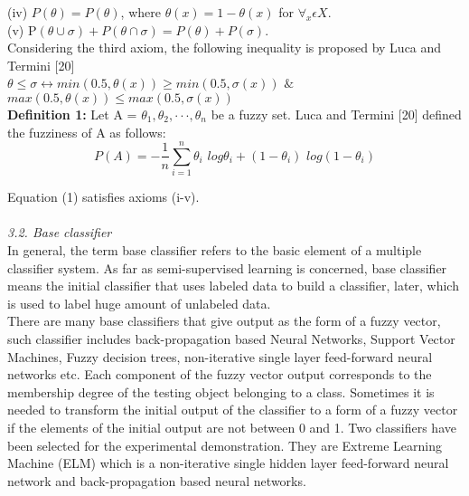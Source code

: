 \documentclass{article}
\begin{document}
		\newpage
		(iv) $P{(\theta)} = P{(\theta)}$, where $\theta(x) = 1 -\theta(x)$ for $\forall_x \epsilon X.$\\
		
		(v) P$(\theta \cup \sigma) + P(\theta \cap \sigma) = P(\theta) + P(\sigma)$.\\
		
		Considering the third axiom, the following inequality is proposed by Luca and Termini [20]\\
		$ \theta \le \sigma \leftrightarrow min(0.5, \theta(x)) \ge min(0.5, \sigma(x))$ $\&$ $max(0.5, \theta(x)) \le max(0.5, \sigma(x))$\\
		
		
		\textbf{ Definition 1:} Let A = {$\theta_1, \theta_2, · · · , \theta_n$} be a fuzzy set. Luca and Termini [20] defined the fuzziness of A as follows:
		\begin{equation} \label{$eq:(1)$}
			P(A) = -\frac {1}{n} \sum_{i=1}^{n} \theta_i\,\, log\theta_i + (1 - \theta_i) \,\,log(1 - \theta_i) 
		\end{equation}

		Equation (1) satisfies axioms (i-v).\\\\[10pt]
		\textit{3.2. Base classifier}\\
		
		In general, the term base classifier refers to the basic element of a multiple classifier system. As far as semi-supervised learning is concerned, base classifier means the initial classifier that uses labeled data to build a classifier, later, which is used to label huge amount of unlabeled data.\\
		
		There are many base classifiers that give output as the form of a fuzzy vector, such classifier includes back-propagation based Neural Networks, Support Vector Machines, Fuzzy decision trees, non-iterative
		single layer feed-forward neural networks etc. Each component of the fuzzy vector output corresponds to the
		membership degree of the testing object belonging to a class. Sometimes it is needed to transform the initial
		output of the classifier to a form of a fuzzy vector if the elements of the initial output are not between 0 and 1.
		Two classifiers have been selected for the experimental demonstration. They are Extreme Learning Machine
		(ELM) which is a non-iterative single hidden layer feed-forward neural network and back-propagation based
		neural networks.\\
		
\end{document}
